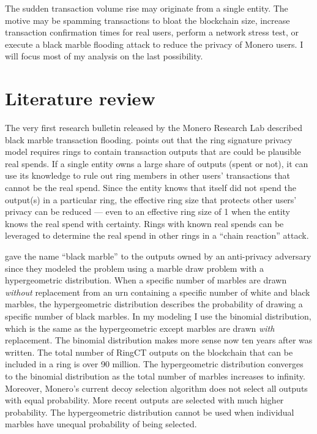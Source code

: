 \documentclass[usletter,11pt,english,openany]{article}
\begin{document}
The sudden transaction volume rise may originate from a single entity.
The motive may be spamming transactions to bloat the blockchain size,
increase transaction confirmation times for real users, perform a
network stress test, or execute a black marble flooding attack to
reduce the privacy of Monero users. I will focus most of my analysis
on the last possibility.

\section{Literature review}

The very first research bulletin released by the Monero Research Lab
described black marble transaction flooding. \cite{Noether2014} points
out that the ring signature privacy model requires rings to contain
transaction outputs that are could be plausible real spends. If a
single entity owns a large share of outputs (spent or not), it can
use its knowledge to rule out ring members in other users' transactions
that cannot be the real spend. Since the entity knows that itself
did not spend the output(s) in a particular ring, the effective ring
size that protects other users' privacy can be reduced --- even to
an effective ring size of 1 when the entity knows the real spend with
certainty. Rings with known real spends can be leveraged to determine
the real spend in other rings in a ``chain reaction'' attack.

\cite{Noether2014} gave the name ``black marble'' to the outputs
owned by an anti-privacy adversary since they modeled the problem
using a marble draw problem with a hypergeometric distribution. When
a specific number of marbles are drawn \textit{without} replacement
from an urn containing a specific number of white and black marbles,
the hypergeometric distribution describes the probability of drawing
a specific number of black marbles. In my modeling I use the binomial
distribution, which is the same as the hypergeometric except marbles
are drawn \textit{with} replacement. The binomial distribution makes
more sense now ten years after \cite{Noether2014} was written. The
total number of RingCT outputs on the blockchain that can be included
in a ring is over 90 million. The hypergeometric distribution converges
to the binomial distribution as the total number of marbles increases
to infinity. Moreover, Monero's current decoy selection algorithm
does not select all outputs with equal probability. More recent outputs
are selected with much higher probability. The hypergeometric distribution
cannot be used when individual marbles have unequal probability of
being selected.
\end{document}
